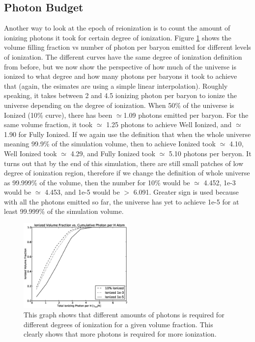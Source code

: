 
\subsection{Photon Budget}

Another way to look at the epoch of reionization is to count the amount of ionizing photons it took for certain degree of ionization.  Figure \ref{numPhoton_Ion} shows the volume filling fraction vs number of photon per baryon emitted for different levels of ionization.  The different curves have the same degree of ionization definition from before, but we now show the perspective of how much of the universe is ionized to what degree and how many photons per baryons it took to achieve that (again, the esimates are using a simple linear interpolation).  Roughly speaking, it takes between 2 and 4.5 ionizing photon per baryon to ionize the universe depending on the degree of ionization.  When 50\% of the universe is Ionized (10\% curve), there has been $\simeq$1.09 photons emitted per baryon.  For the same volume fraction, it took $\simeq$ 1.25 photons to achieve Well Ionized, and $\simeq$ 1.90 for Fully Ionized.  If we again use the definition that when the whole universe meaning 99.9\% of the simulation volume, then to achieve Ionized took $\simeq$ 4.10, Well Ionized took $\simeq$ 4.29, and Fully Ionized took $\simeq$ 5.10 photons per beryon.  It turns out that by the end of this simulation, there are still small patches of low degree of ionization region, therefore if we change the definition of whole universe as 99.999\% of the volume, then the number for 10\% would be $\simeq$ 4.452, 1e-3 would be $\simeq$ 4.453, and 1e-5 would be $>$ 6.091.  Greater sign is used because with all the photons emitted so far, the universe has yet to achieve 1e-5 for at least 99.999\% of the simulation volume.

\begin{figure}
  \includegraphics[width=0.5\textwidth]{bnumPhoton_Ion.eps}
  \caption{\footnotesize This graph shows that different amounts of photons is required for different degrees of ionization for a given volume fraction.  This clearly shows that more photons is required for more ionization.}
  \label{numPhoton_Ion}
\end{figure}